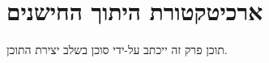 \section{ארכיטקטורת היתוך החישנים}
\label{sec:fusion}

תוכן פרק זה ייכתב על-ידי סוכן  בשלב יצירת התוכן.

